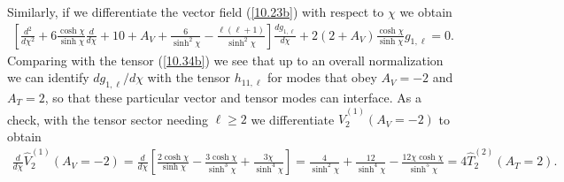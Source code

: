 \documentclass[aps,onecolumn,10pt]{revtex4}
\numberwithin{equation}{section}
\numberwithin{equation}{section}
\begin{document}
Similarly, if we differentiate the vector field (\ref{10.23b}) with respect to $\chi$ we  obtain
%
\begin{eqnarray}
\left[\frac{d^2}{d\chi^2}+6\frac{\cosh\chi}{ \sinh\chi}\frac{d }{d\chi}
+10+A_V+\frac{6 }{ \sinh^2\chi}-\frac{\ell(\ell+1)}{ \sinh^2\chi}\right]\frac{d g_{1,\ell}}{d \chi}
+2(2+A_V)\frac{\cosh\chi}{\sinh\chi}g_{1,\ell}=0.
\label{11.3}
\end{eqnarray}
%
Comparing with the tensor (\ref{10.34b}) we see that up to an overall normalization we can identify $d g_{1,\ell}/d\chi$ with the tensor $h_{11,\ell}$ for modes that obey $A_V=-2$ and $A_T=2$, so that these particular vector and tensor modes can interface. As a check, with the tensor sector needing $\ell \geq 2$ we differentiate $\hat{V}^{(1)}_2(A_V=-2)$ to obtain
%  
\begin{eqnarray}
 \frac{d}{d \chi}\hat{V}^{(1)}_2(A_V=-2) = \frac{d}{d \chi}\left[\frac{2\cosh\chi}{\sinh\chi}-\frac{3\cosh\chi }{\sinh^3\chi}+\frac{3\chi}{\sinh^4\chi}\right]
 =\frac{4}{\sinh^2\chi}+\frac{12}{\sinh^4\chi}-\frac{12\chi\cosh\chi}{\sinh^5\chi}=4\hat{T}^{(2)}_2(A_T=2).~~
\label{11.4}
\end{eqnarray}
%
\end{document}
